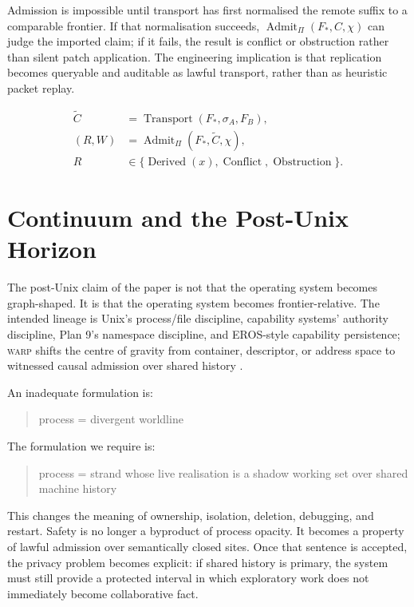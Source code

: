 \documentclass[11pt]{article}
\theoremstyle{definition}
\theoremstyle{plain}
\theoremstyle{remark}
\newcommand{\WARP}{\textsc{warp}}
\begin{document}
Admission is impossible until transport has first normalised the remote suffix to a comparable frontier. If that normalisation succeeds, \(\operatorname{Admit}_{\Pi}(F_*, C, \chi)\) can judge the imported claim; if it fails, the result is conflict or obstruction rather than silent patch application. The engineering implication is that replication becomes queryable and auditable as lawful transport, rather than as heuristic packet replay.

\[
\begin{aligned}
\widetilde{C}
&=
\operatorname{Transport}(F_*, \sigma_A, F_B),\\
(R, W)
&=
\operatorname{Admit}_{\Pi}(F_*, \widetilde{C}, \chi),\\
R
&\in
\{\operatorname{Derived}(x), \operatorname{Conflict}, \operatorname{Obstruction}\}.
\end{aligned}
\]

\section{Continuum and the Post-Unix Horizon}

The post-Unix claim of the paper is not that the operating system becomes graph-shaped. It is that the operating system becomes frontier-relative. The intended lineage is Unix's process/file discipline, capability systems' authority discipline, Plan 9's namespace discipline, and EROS-style capability persistence; \WARP{} shifts the centre of gravity from container, descriptor, or address space to witnessed causal admission over shared history \cite{ritchie1974unix,dennis1966programming,pike1995plan9,shapiro1999eros}.

An inadequate formulation is:

\begin{quote}
process = divergent worldline
\end{quote}

The formulation we require is:

\begin{quote}
process = strand whose live realisation is a shadow working set over shared machine history
\end{quote}

This changes the meaning of ownership, isolation, deletion, debugging, and restart. Safety is no longer a byproduct of process opacity. It becomes a property of lawful admission over semantically closed sites. Once that sentence is accepted, the privacy problem becomes explicit: if shared history is primary, the system must still provide a protected interval in which exploratory work does not immediately become collaborative fact.
\end{document}
